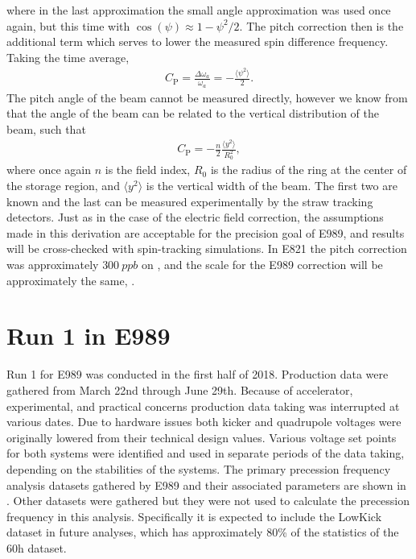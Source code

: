 where in the last approximation the small angle approximation was used once again, but this time with $\cos(\psi) \approx 1 - \psi^{2}/2$. The pitch correction then is the additional term which serves to lower the measured spin difference frequency. Taking the time average,
        \begin{align}
            C_{\text{P}} = \frac{\Delta\omega_{a}}{\omega_{a}} = - \frac{\langle \psi^{2} \rangle}{2}.
        \end{align}
The pitch angle of the beam cannot be measured directly, however we know from  that the angle of the beam can be related to the vertical distribution of the beam, such that 
        \begin{align}
            C_{\text{P}} = - \frac{n}{2} \frac{\langle y^{2} \rangle}{R_{0}^{2}},
        \end{align}
where once again $n$ is the field index, $R_{0}$ is the radius of the ring at the center of the storage region, and $\langle y^{2} \rangle$ is the vertical width of the beam. The first two are known and the last can be measured experimentally by the straw tracking detectors. Just as in the case of the electric field correction, the assumptions made in this derivation are acceptable for the precision goal of E989, and results will be cross-checked with spin-tracking simulations. In E821 the pitch correction was approximately $\SI{300}{ppb}$ on \wa \cite{E821FinalReport}, and the scale for the E989 correction will be approximately the same, .




\section{Run 1 in E989}
\label{sec:Run1}


Run 1 for E989 was conducted in the first half of 2018. Production data were gathered from March 22nd through June 29th. Because of accelerator, experimental, and practical concerns production data taking was interrupted at various dates. Due to hardware issues both kicker and quadrupole voltages were originally lowered from their technical design values. Various voltage set points for both systems were identified and used in separate periods of the data taking, depending on the stabilities of the systems. The primary precession frequency analysis datasets gathered by E989 and their associated parameters are shown in . Other datasets were gathered but they were not used to calculate the precession frequency in this analysis. Specifically it is expected to include the LowKick dataset in future analyses, which has approximately 80\% of the statistics of the 60h dataset. 


